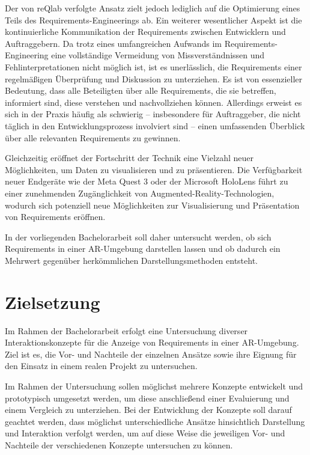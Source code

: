 Der von reQlab verfolgte Ansatz zielt jedoch lediglich auf die Optimierung eines Teils des Requirements-Engineerings ab.
Ein weiterer wesentlicher Aspekt ist die kontinuierliche Kommunikation der Requirements zwischen Entwicklern und Auftraggebern.
Da trotz eines umfangreichen Aufwands im Requirements-Engineering eine vollständige Vermeidung von Missverständnissen und Fehlinterpretationen nicht möglich ist, ist es unerlässlich, die Requirements einer regelmäßigen Überprüfung und Diskussion zu unterziehen.
Es ist von essenzieller Bedeutung, dass alle Beteiligten über alle Requirements, die sie betreffen, informiert sind, diese verstehen und nachvollziehen können.
Allerdings erweist es sich in der Praxis häufig als schwierig -- insbesondere für Auftraggeber, die nicht täglich in den Entwicklungsprozess involviert sind -- einen umfassenden Überblick über alle relevanten Requirements zu gewinnen.

Gleichzeitig eröffnet der Fortschritt der Technik eine Vielzahl neuer Möglichkeiten, um Daten zu visualisieren und zu präsentieren.
Die Verfügbarkeit neuer Endgeräte wie der Meta Quest 3 oder der Microsoft HoloLens führt zu einer zunehmenden Zugänglichkeit von Augmented-Reality-Technologien, wodurch sich potenziell neue Möglichkeiten zur Visualisierung und Präsentation von Requirements eröffnen.

In der vorliegenden Bachelorarbeit soll daher untersucht werden, ob sich Requirements in einer AR-Umgebung darstellen lassen und ob dadurch ein Mehrwert gegenüber herkömmlichen Darstellungsmethoden entsteht.



\section{Zielsetzung}

Im Rahmen der Bachelorarbeit erfolgt eine Untersuchung diverser Interaktionskonzepte für die Anzeige von Requirements in einer AR-Umgebung.
Ziel ist es, die Vor- und Nachteile der einzelnen Ansätze sowie ihre Eignung für den Einsatz in einem realen Projekt zu untersuchen.

Im Rahmen der Untersuchung sollen möglichst mehrere Konzepte entwickelt und prototypisch umgesetzt werden, um diese anschließend einer Evaluierung und einem Vergleich zu unterziehen.
Bei der Entwicklung der Konzepte soll darauf geachtet werden, dass möglichst unterschiedliche Ansätze hinsichtlich Darstellung und Interaktion verfolgt werden, um auf diese Weise die jeweiligen Vor- und Nachteile der verschiedenen Konzepte untersuchen zu können.


